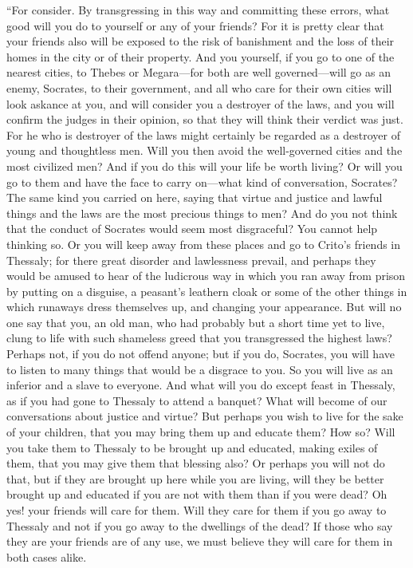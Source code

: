 \documentclass[letterpaper,12pt]{article}
\begin{document}
\begin{drama}
``For consider. By transgressing in this way and committing these errors, what good will you do to yourself or  any of your friends? For it is pretty clear that your friends also will be exposed to the risk of banishment and the loss of their homes in the city or of their property. And you yourself, if you go to one of the nearest cities, to Thebes or Megara---for both are well governed---will go as an enemy, Socrates, to their government, and all who care for their own cities will look askance at you, and will consider you a destroyer of the laws,  and you will confirm the judges in their opinion, so that they will think their verdict was just. For he who is destroyer of the laws might certainly be regarded as a destroyer of young and thoughtless men. Will you then avoid the well-governed cities and the most civilized men? And if you do this will your life be worth living? Or will you go to them and have the face to carry on---what kind of conversation, Socrates? The same kind you carried on here, saying that virtue and justice and lawful things and the laws are the most precious things to men? And do you not think that the conduct of Socrates would seem most disgraceful?  You cannot help thinking so. Or you will keep away from these places and go to Crito's friends in Thessaly; for there great disorder and lawlessness prevail, and perhaps they would be amused to hear of the ludicrous way in which you ran away from prison by putting on a disguise, a peasant's leathern cloak or some of the other things in which runaways dress themselves up, and changing your appearance. But will no one say that you, an old man, who had probably but a short time yet to live,  clung to life with such shameless greed that you transgressed the highest laws? Perhaps not, if you do not offend anyone; but if you do, Socrates, you will have to listen to many things that would be a disgrace to you. So you will live as an inferior and a slave to everyone. And what will you do except feast in Thessaly, as if you had gone to Thessaly to attend a banquet? What will become of our conversations about justice and  virtue? But perhaps you wish to live for the sake of your children, that you may bring them up and educate them? How so? Will you take them to Thessaly to be brought up and educated, making exiles of them, that you may give them that blessing also? Or perhaps you will not do that, but if they are brought up here while you are living, will they be better brought up and educated if you are not with them than if you were dead? Oh yes! your friends will care for them. Will they care for them if you go away to Thessaly and not if you go away to the dwellings of the dead? If those who say they are your friends  are of any use, we must believe they will care for them in both cases alike.

\end{drama}
\end{document}
